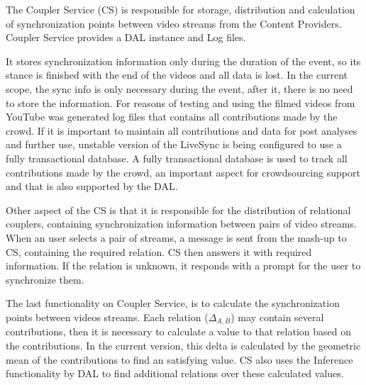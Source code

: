The Coupler Service (CS) is responsible for storage, distribution and calculation of synchronization points between video streams from the Content Providers. Coupler Service provides a DAL instance and Log files. 







It stores synchronization information only during the duration of the event, so its stance is finished with the end of the videos and all data is lost. In the current scope, the sync info is only necessary during the event, after it, there is no need to store the information. For reasons of testing and using the filmed videos from YouTube was generated log files that contains all contributions made by the crowd. If it is important to maintain all contributions and data for post analyses and further use, unstable version of the LiveSync is being configured to use a fully transactional database.  A fully transactional database is used to track all contributions made by the crowd, an important aspect for crowdsourcing support and that is also supported by the DAL.

Other aspect of the CS is that it is responsible for the distribution of relational couplers, containing synchronization information between pairs of video streams. When an user selects a pair of streams, a message is sent from the mash-up to CS, containing the required relation. CS then answers it with required information. If the relation is unknown, it responds with a prompt for the user to synchronize them.

The last functionality on Coupler Service, is to calculate the synchronization points between videos streams. Each relation ($\Delta_{A,B}$) may contain several contributions, then it is necessary to calculate a value to that relation based on the contributions. In the current version, this delta is calculated by the geometric mean of the contributions to find an satisfying value. CS also uses the Inference functionality by DAL to find additional relations over these calculated values.

